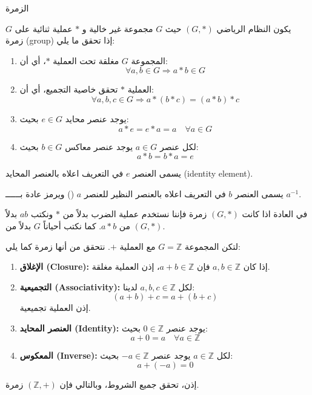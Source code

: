 
\begin{definition}{الزمرة}{\cite{ref2}}
	يكون النظام الرياضي $(G, *)$ حيث $G$ مجموعة غير خالية و $*$ عملية ثنائية على $G$ زمرة (group) إذا تحقق ما يلي:
	\begin{enumerate}
		\item المجموعة $G$ مغلقة تحت العملية $*$، أي أن:
		\[
		\forall a, b \in G \Rightarrow a * b \in G
		\]
		
		\item العملية $*$ تحقق خاصية التجميع، أي أن:
		\[
		\forall a, b, c \in G \Rightarrow a * (b * c) = (a * b) * c
		\]
		
		\item يوجد عنصر محايد $e \in G$ بحيث:
		\[
		a * e = e * a = a \quad \forall a \in G
		\]
		
		\item لكل عنصر $a \in G$ يوجد عنصر معاكس $b \in G$ بحيث:
		\[
		a * b = b * a = e
		\]	
	\end{enumerate}
	
\end{definition}

\begin{note}
\begin{tasks*}
	\item 	يسمى العنصر $e$ في التعريف اعلاه بالعنصر المحايد 
	(identity element).
	
	\item يسمى العنصر $b$ في التعريف اعلاه بالعنصر النظير للعنصر $a$ () ويرمز عادة بــــــ $a^{-1}$.
	
	\item في العادة اذا كانت $(G, *)$ زمرة فإننا نستخدم عملية الضرب بدلاً من $*$ ونكتب $ab$ بدلاً من $a*b$. كما نكتب أحياناً $G$ بدلاً من 
	$(G, *)$.
\end{tasks*}
\end{note}

\begin{example}
	لتكن المجموعة \( G = \mathbb{Z} \) مع العملية \( + \). نتحقق من أنها زمرة كما يلي:
	\begin{enumerate}[label=(\alph*)]
		\item \textbf{الإغلاق (Closure):}  
		إذا كان \( a, b \in \mathbb{Z} \) فإن \( a + b \in \mathbb{Z} \)، إذن العملية مغلقة.
		\item \textbf{التجميعية (Associativity):}  
		لكل \( a, b, c \in \mathbb{Z} \) لدينا:
		\[
		(a + b) + c = a + (b + c)
		\]
		إذن العملية تجميعية.
		\item \textbf{العنصر المحايد (Identity):}  
		يوجد عنصر \( 0 \in \mathbb{Z} \) بحيث:
		\[
		a + 0 = a \quad \forall a \in \mathbb{Z}
		\]
		\item \textbf{المعكوس (Inverse):}  
		لكل \( a \in \mathbb{Z} \) يوجد عنصر \( -a \in \mathbb{Z} \) بحيث:
		\[
		a + (-a) = 0
		\]
	\end{enumerate}
	إذن، تحقق جميع الشروط، وبالتالي فإن \( (\mathbb{Z}, +) \) زمرة.
\end{example}

